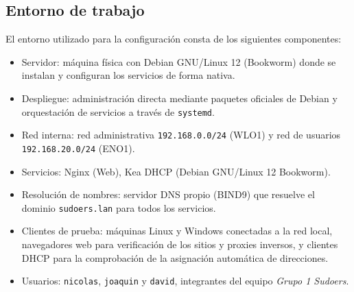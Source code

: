 \subsection{Entorno de trabajo}

El entorno utilizado para la configuración consta de los siguientes
componentes:

\begin{itemize}
  \item Servidor: máquina física con Debian GNU/Linux 12 (Bookworm) donde se
        instalan y configuran los servicios de forma nativa.
  \item Despliegue: administración directa mediante paquetes oficiales de
        Debian y orquestación de servicios a través de \texttt{systemd}.
  \item Red interna: red administrativa \texttt{192.168.0.0/24}
        (WLO1) y red de usuarios \texttt{192.168.20.0/24} (ENO1).
  \item Servicios: Nginx (Web), Kea DHCP (Debian GNU/Linux 12 Bookworm).
  \item Resolución de nombres: servidor DNS propio (BIND9) que resuelve
        el dominio \texttt{sudoers.lan} para todos los servicios.
  \item Clientes de prueba: máquinas Linux y Windows conectadas a la
        red local, navegadores web para verificación de los sitios y
        proxies inversos, y clientes DHCP para la comprobación de la
        asignación automática de direcciones.
  \item Usuarios: \texttt{nicolas}, \texttt{joaquin} y
        \texttt{david}, integrantes del equipo \textit{Grupo 1 Sudoers}.
\end{itemize}